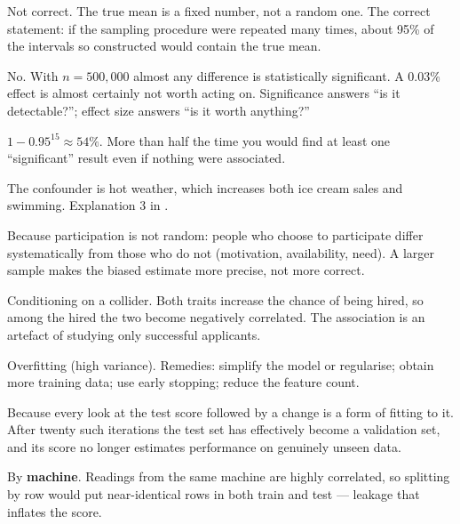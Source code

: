 \begin{ans}
  \item Not correct. The true mean is a fixed number, not a random one. The correct
        statement: if the sampling procedure were repeated many times, about 95\% of
        the intervals so constructed would contain the true mean.
  \item No. With $n=500{,}000$ almost any difference is statistically significant.
        A 0.03\% effect is almost certainly not worth acting on. Significance
        answers ``is it detectable?''; effect size answers ``is it worth anything?''
  \item $1 - 0.95^{15} \approx 54\%$. More than half the time you would find at
        least one ``significant'' result even if nothing were associated.
\end{ans}

\begin{ans}
  \item The confounder is hot weather, which increases both ice cream sales and
        swimming. Explanation 3 in .
  \item Because participation is not random: people who choose to participate differ
        systematically from those who do not (motivation, availability, need). A
        larger sample makes the biased estimate more precise, not more correct.
  \item Conditioning on a collider. Both traits increase the chance of being hired,
        so among the hired the two become negatively correlated. The association is
        an artefact of studying only successful applicants.
\end{ans}

\begin{ans}
  \item Overfitting (high variance). Remedies: simplify the model or regularise;
        obtain more training data; use early stopping; reduce the feature count.
  \item Because every look at the test score followed by a change is a form of
        fitting to it. After twenty such iterations the test set has effectively
        become a validation set, and its score no longer estimates performance on
        genuinely unseen data.
  \item By \textbf{machine}. Readings from the same machine are highly correlated,
        so splitting by row would put near-identical rows in both train and test ---
        leakage that inflates the score.
\end{ans}

